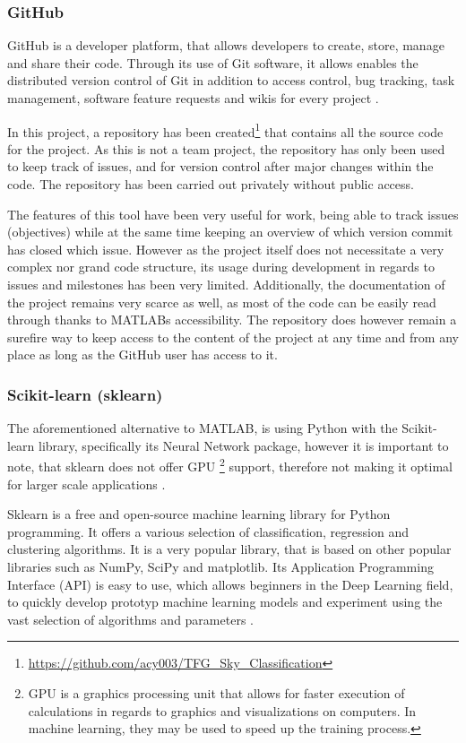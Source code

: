 \subsubsection{GitHub}
GitHub is a developer platform, that allows developers to create, store, manage and share their code. Through its use of Git software, it allows enables the distributed version control of Git in addition to access control, bug tracking, task management, software feature requests and wikis for every project \cite{github:wiki}. 

In this project, a repository has been created\footnote{\url{https://github.com/acy003/TFG_Sky_Classification}} that contains all the source code for the project. As this is not a team project, the repository has only been used to keep track of issues, and for version control after major changes within the code. The repository has been carried out privately without public access. 

The features of this tool have been very useful for work, being able to track issues (objectives) while at the same time keeping an overview of which version commit has closed which issue. However as the project itself does not necessitate a very complex nor grand code structure, its usage during development in regards to issues and milestones has been very limited. Additionally, the documentation of the project remains very scarce as well, as most of the code can be easily read through thanks to MATLABs accessibility. The repository does however remain a surefire way to keep access to the content of the project at any time and from any place as long as the GitHub user has access to it.

\subsubsection{Scikit-learn (sklearn)}
The aforementioned alternative to MATLAB, is using Python with the Scikit-learn library, specifically its Neural Network package, however it is important to note, that sklearn does not offer GPU \footnote{GPU is a graphics processing unit that allows for faster execution of calculations in regards to graphics and visualizations on computers. In machine learning, they may be used to speed up the training process.} support, therefore not making it optimal for larger scale applications \cite{sklearn:NNs}.

Sklearn is a free and open-source machine learning library for Python programming. It offers a various selection of classification, regression and clustering algorithms. It is a very popular library, that is based on other popular libraries such as NumPy, SciPy and matplotlib. Its Application Programming Interface (API) is easy to use, which allows beginners in the Deep Learning field, to quickly develop prototyp machine learning models and experiment using the vast selection of algorithms and parameters \cite{sklearn:wiki} .

